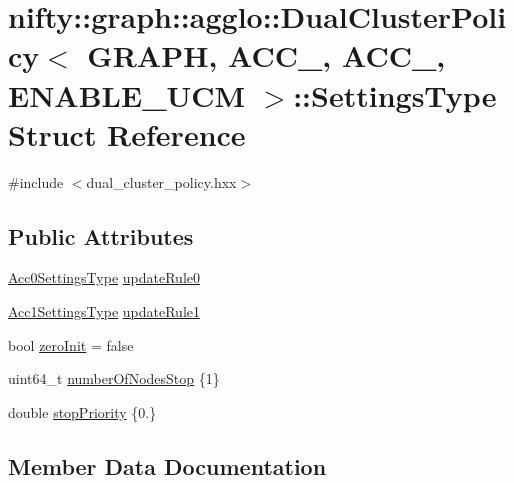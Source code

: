 \hypertarget{structnifty_1_1graph_1_1agglo_1_1DualClusterPolicy_1_1SettingsType}{}\section{nifty\+:\+:graph\+:\+:agglo\+:\+:Dual\+Cluster\+Policy$<$ G\+R\+A\+PH, A\+C\+C\+\_, A\+C\+C\+\_, E\+N\+A\+B\+L\+E\+\_\+\+U\+CM $>$\+:\+:Settings\+Type Struct Reference}
\label{structnifty_1_1graph_1_1agglo_1_1DualClusterPolicy_1_1SettingsType}


{\ttfamily \#include $<$dual\+\_\+cluster\+\_\+policy.\+hxx$>$}

\subsection*{Public Attributes}
\begin{DoxyCompactItemize}
\item 
\hyperlink{classnifty_1_1graph_1_1agglo_1_1DualClusterPolicy_ac8d246f0a0387bf78fcf9d823496e515}{Acc0\+Settings\+Type} \hyperlink{structnifty_1_1graph_1_1agglo_1_1DualClusterPolicy_1_1SettingsType_a91329a93ee9c8970b07e2f9ccdd55b2e}{update\+Rule0}
\item 
\hyperlink{classnifty_1_1graph_1_1agglo_1_1DualClusterPolicy_a9e9443784c4c09926fd8c97608547779}{Acc1\+Settings\+Type} \hyperlink{structnifty_1_1graph_1_1agglo_1_1DualClusterPolicy_1_1SettingsType_a3af27b47b9bb650c5bcfafbbbcd282e3}{update\+Rule1}
\item 
bool \hyperlink{structnifty_1_1graph_1_1agglo_1_1DualClusterPolicy_1_1SettingsType_a796a7b0830f3187d5b0404db8fa5352a}{zero\+Init} = false
\item 
uint64\+\_\+t \hyperlink{structnifty_1_1graph_1_1agglo_1_1DualClusterPolicy_1_1SettingsType_a4671ea97b17f3a41adaf8568681fedb0}{number\+Of\+Nodes\+Stop} \{1\}
\item 
double \hyperlink{structnifty_1_1graph_1_1agglo_1_1DualClusterPolicy_1_1SettingsType_a1ee28fa61442c369eee0e43d5aa33499}{stop\+Priority} \{0.\}
\end{DoxyCompactItemize}


\subsection{Member Data Documentation}
\mbox{\label{structnifty_1_1graph_1_1agglo_1_1DualClusterPolicy_1_1SettingsType_a4671ea97b17f3a41adaf8568681fedb0}} 
